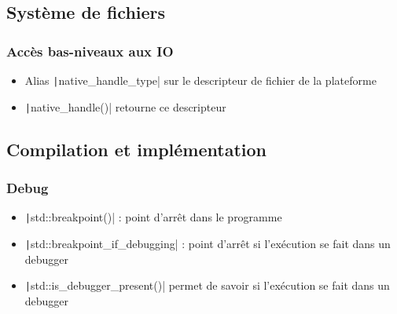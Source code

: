 \documentclass[C++.tex]{subfiles}
\begin{document}
\subsection*{Système de fichiers}
\begin{frame}[fragile]
	\frametitle{Accès bas-niveaux aux IO}
	\begin{itemize}
		\item Alias \texttt|native_handle_type| sur le descripteur de fichier de la plateforme
		
		 
		\item \texttt|native_handle()| retourne ce descripteur
	\end{itemize}
\end{frame}

\subsection*{Compilation et implémentation}
\begin{frame}[fragile]
	\frametitle{Debug}
	\begin{itemize}
		\item \texttt|std::breakpoint()| : point d'arrêt dans le programme
		\item \texttt|std::breakpoint_if_debugging| : point d'arrêt si l'exécution se fait dans un debugger
		\item \texttt|std::is_debugger_present()| permet de savoir si l'exécution se fait dans un debugger
	\end{itemize}
\end{frame}
\end{document}
